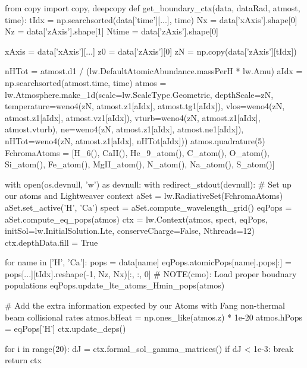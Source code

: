\begin{pycode}[2DRT]
from copy import copy, deepcopy
def get_boundary_ctx(data, dataRad, atmost, time):
    tIdx = np.searchsorted(data['time'][...], time)
    Nx = data['xAxis'].shape[0]
    Nz = data['zAxis'].shape[1]
    Ntime = data['zAxis'].shape[0]

    xAxis = data['xAxis'][...]
    z0 = data['zAxis'][0]
    zN = np.copy(data['zAxis'][tIdx])

    nHTot = atmost.d1 / (lw.DefaultAtomicAbundance.massPerH * lw.Amu)
    aIdx = np.searchsorted(atmost.time, time)
    atmos = lw.Atmosphere.make_1d(scale=lw.ScaleType.Geometric, depthScale=zN,
                                  temperature=weno4(zN, atmost.z1[aIdx], atmost.tg1[aIdx]),
                                  vlos=weno4(zN, atmost.z1[aIdx], atmost.vz1[aIdx]),
                                  vturb=weno4(zN, atmost.z1[aIdx], atmost.vturb),
                                  ne=weno4(zN, atmost.z1[aIdx], atmost.ne1[aIdx]),
                                  nHTot=weno4(zN, atmost.z1[aIdx], nHTot[aIdx]))
    atmos.quadrature(5)
    FchromaAtoms = [H_6(), CaII(), He_9_atom(), C_atom(), O_atom(), Si_atom(), Fe_atom(),
                MgII_atom(), N_atom(), Na_atom(), S_atom()]

    with open(os.devnull, 'w') as devnull:
        with redirect_stdout(devnull):
            # Set up our atoms and Lightweaver context
            aSet = lw.RadiativeSet(FchromaAtoms)
            aSet.set_active('H', 'Ca')
            spect = aSet.compute_wavelength_grid()
            eqPops = aSet.compute_eq_pops(atmos)
            ctx = lw.Context(atmos, spect, eqPops, initSol=lw.InitialSolution.Lte, conserveCharge=False,
                            Nthreads=12)
            ctx.depthData.fill = True

            for name in ['H', 'Ca']:
                pops = data[name]
                eqPops.atomicPops[name].pops[:] = pops[...][tIdx].reshape(-1, Nz, Nx)[:, :, 0] # NOTE(cmo): Load proper boudnary populations
            eqPops.update_lte_atoms_Hmin_pops(atmos)

            # Add the extra information expected by our Atoms with Fang non-thermal beam collisional rates
            atmos.bHeat = np.ones_like(atmos.z) * 1e-20
            atmos.hPops = eqPops['H']
            ctx.update_deps()

            for i in range(20):
                dJ = ctx.formal_sol_gamma_matrices()
                if dJ < 1e-3:
                    break
    return ctx


\end{pycode}
